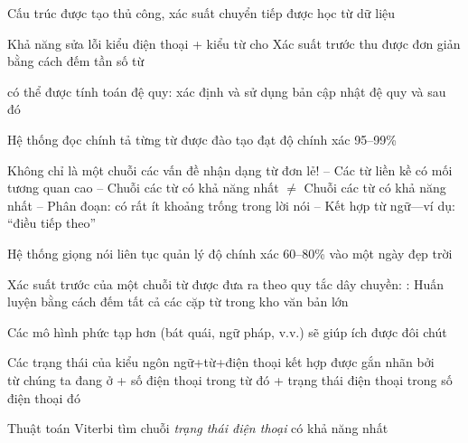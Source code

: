 \documentclass{article}
\begin{document}
\begin{huge}
Cấu trúc được tạo thủ công, xác suất chuyển tiếp được học từ dữ liệu




Khả năng sửa lỗi kiểu điện thoại + kiểu từ  cho 
\mat{\[
P(word|e_{1:t}) = \alpha P(e_{1:t}|word) P(word)
\]}%
Xác suất trước  thu được đơn giản bằng cách đếm tần số từ

 có thể được tính toán đệ quy: xác định
\mat{\[
  \bell_{1:t}\eq \pv(\X_t,\e_{1:t})
\]}%
và sử dụng bản cập nhật đệ quy
\mat{\[
  \bell_{1:t+1} = \noprog{Forward}(\ell_{1:t},\e_{t+1})
\]}%
và sau đó 

Hệ thống đọc chính tả từng từ được đào tạo đạt độ chính xác 95--99\%



Không chỉ là một chuỗi các vấn đề nhận dạng từ đơn lẻ!\al
-- Các từ liền kề có mối tương quan cao \al
-- Chuỗi các từ có khả năng nhất $\neq$ Chuỗi các từ có khả năng nhất \al
-- Phân đoạn: có rất ít khoảng trống trong lời nói\al
-- Kết hợp từ ngữ---ví dụ: ``điều tiếp theo''

Hệ thống giọng nói liên tục quản lý độ chính xác 60--80\% vào một ngày đẹp trời



Xác suất trước của một chuỗi từ được đưa ra theo quy tắc dây chuyền:
\mat{\[
P(w_{1}\cdots w_{n}) = \prod_{i=1}^{n} P(w_i|w_{1}\cdots w_{i-1})
\]}%
:
%
Huấn luyện bằng cách đếm tất cả các cặp từ trong kho văn bản lớn

Các mô hình phức tạp hơn (bát quái, ngữ pháp, v.v.) sẽ giúp ích được đôi chút





Các trạng thái của kiểu ngôn ngữ+từ+điện thoại kết hợp được gắn nhãn bởi\\
từ chúng ta đang ở + số điện thoại trong từ đó + trạng thái điện thoại trong số điện thoại đó

Thuật toán Viterbi tìm chuỗi \emph{trạng thái điện thoại} có khả năng nhất


\end{huge}
\end{document}
